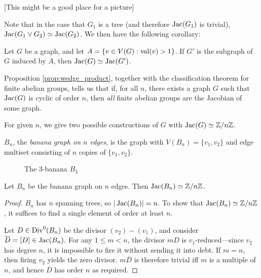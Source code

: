 \documentclass{amsart}
\begin{document}
[This might be a good place for a picture]

Note that in the case that $G_1$ is a tree (and therefore $\operatorname{Jac}(G_1)$
is trivial), $\operatorname{Jac}(G_1 \vee G_2) \simeq \operatorname{Jac}(G_2)$. We then have
the following corollary:
\begin{cor}
  \label{cor:1_valent}
  Let $G$ be a graph, and let $A = \{v \in V(G) : \operatorname{val}(v) > 1\}$. If
  $G'$ is the subgraph of $G$ induced by $A$, then $\operatorname{Jac}(G) \simeq
  \operatorname{Jac}(G')$.
\end{cor}

Proposition \ref{prop:wedge_product}, together with the classification
theorem for finite abelian groups, tells us that if, for all $n$,
there exists a graph $G$ such that $\operatorname{Jac}(G)$ is cyclic of order $n$,
then \emph{all} finite abelian groups are the Jacobian of some graph.

For given $n$, we give two possible constructions of $G$ with $\operatorname{Jac}(G)
\simeq \mathbb{Z}/n\mathbb{Z}$.

\begin{defn}
  $B_n$, the \emph{banana graph on $n$ edges}, is the graph with
  $V(B_n) = \{v_1, v_2\}$ and edge multiset consisting of $n$ copies of
  $\{v_1, v_2\}$.
\end{defn}

\begin{figure}[h]
  \begin{center}
    \caption{The $3$-banana $B_3$}
  \end{center}
\end{figure}

\begin{prop}
  \label{prop:banana_cyclic}
  Let $B_n$ be the banana graph on $n$ edges. Then $\operatorname{Jac}(B_n) \simeq \mathbb{Z}/n\mathbb{Z}$.
\end{prop}

\begin{proof}
  $B_n$ has $n$ spanning trees, so
  $|\operatorname{Jac}(B_n)| = n$. To show that $\operatorname{Jac}(B_n) \simeq \mathbb{Z}/n\mathbb{Z}$, it
  suffices to find a single element of order at least $n$.

  Let $D \in \operatorname{Div}^0(B_n)$ be the divisor $(v_2) - (v_1)$, and consider
  $\overline{D} = [D] \in \operatorname{Jac}(B_n)$. For any $1 \le m < n$, the
  divisor $mD$ is $v_1$-reduced---since $v_2$ has degree $n$, it is
  impossible to fire it without sending it into debt. If $m=n$, then
  firing $v_2$ yields the zero divisor. $m\overline{D}$ is therefore
  trivial iff $m$ is a multiple of $n$, and hence $\overline{D}$ has
  order $n$ as required.
\end{proof}
\end{document}
